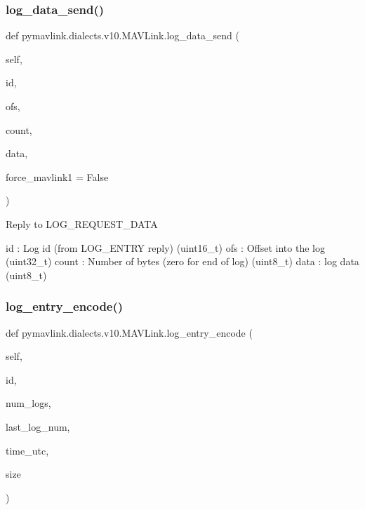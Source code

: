 \begin{DoxyVerb}
\begin{DoxyVerb}
\begin{DoxyVerb}
\begin{DoxyVerb}
\subsubsection{\texorpdfstring{log\+\_\+data\+\_\+send()}{log\_data\_send()}}
{\footnotesize\ttfamily def pymavlink.\+dialects.\+v10.\+M\+A\+V\+Link.\+log\+\_\+data\+\_\+send (\begin{DoxyParamCaption}\item[{}]{self,  }\item[{}]{id,  }\item[{}]{ofs,  }\item[{}]{count,  }\item[{}]{data,  }\item[{}]{force\+\_\+mavlink1 = {\ttfamily False} }\end{DoxyParamCaption})}

\begin{DoxyVerb}Reply to LOG_REQUEST_DATA

id                        : Log id (from LOG_ENTRY reply) (uint16_t)
ofs                       : Offset into the log (uint32_t)
count                     : Number of bytes (zero for end of log) (uint8_t)
data                      : log data (uint8_t)\end{DoxyVerb}
 \mbox{\label{classpymavlink_1_1dialects_1_1v10_1_1MAVLink_aa4d2b903c1a43469840c70c11c959d2a}} 
\subsubsection{\texorpdfstring{log\+\_\+entry\+\_\+encode()}{log\_entry\_encode()}}
{\footnotesize\ttfamily def pymavlink.\+dialects.\+v10.\+M\+A\+V\+Link.\+log\+\_\+entry\+\_\+encode (\begin{DoxyParamCaption}\item[{}]{self,  }\item[{}]{id,  }\item[{}]{num\+\_\+logs,  }\item[{}]{last\+\_\+log\+\_\+num,  }\item[{}]{time\+\_\+utc,  }\item[{}]{size }\end{DoxyParamCaption})}


\end{DoxyVerb}
\end{DoxyVerb}
\end{DoxyVerb}
\end{DoxyVerb}
